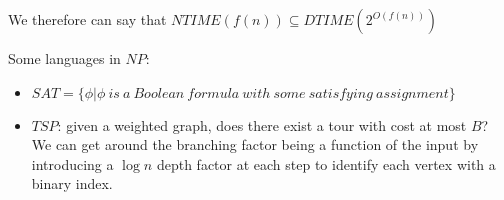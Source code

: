 \documentclass[twoside]{article}
\begin{document}
We therefore can say that $NTIME(f(n)) \subseteq DTIME(2^{O(f(n))})$


Some languages in $NP$:
\begin{itemize}
	\item $SAT = \{\phi | \phi \ is \ a \ Boolean \ formula \ with\ some \ satisfying \ assignment  \}$
	\item $TSP$: given a weighted graph, does there exist a tour with cost at most $B$?  We can get around the branching factor being a function of the input by introducing a $\log n$ depth factor at each step to identify each vertex with a binary index.
	
\end{itemize}
\end{document}
